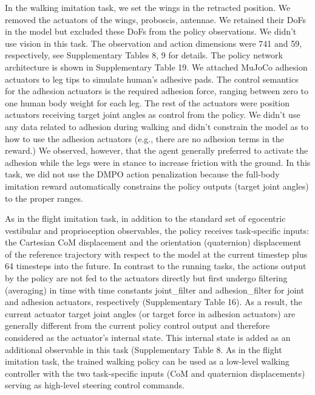\documentclass[sn-mathphys-num]{sn-jnl}%
\theoremstyle{thmstyleone}%
\theoremstyle{thmstyletwo}%
\theoremstyle{thmstylethree}%
\begin{document}
\begin{appendices}
In the walking imitation task, we set the wings in the retracted position. 
We removed the actuators of the wings, proboscis, antennae. 
We retained their DoFs in the model but excluded these DoFs from the policy observations. 
We didn’t use vision in this task. 
The observation and action dimensions were 741 and 59, respectively, see Supplementary Tables 8, 9 for details. 
The policy network architecture is shown in Supplementary Table 19. 
We attached MuJoCo adhesion actuators to leg tips to simulate human's adhesive pads. 
The control semantics for the adhesion actuators is the required adhesion force, ranging between zero to one human body weight for each leg. 
The rest of the actuators were position actuators receiving target joint angles as control from the policy. 
We didn't use any data related to adhesion during walking and didn’t constrain the model as to how to use the adhesion actuators (e.g., there are no adhesion terms in the reward.) 
We observed, however, that the agent generally preferred to activate the adhesion while the legs were in stance to increase friction with the ground. 
In this task, we did not use the DMPO action penalization because the full-body imitation reward automatically constrains the policy outputs (target joint angles) to the proper ranges.


As in the flight imitation task, in addition to the standard set of egocentric vestibular and proprioception observables, the policy receives task-specific inputs: the Cartesian CoM displacement and the orientation (quaternion) displacement of the reference trajectory with respect to the model at the current timestep plus 64 timesteps into the future. 
In contrast to the running tasks, the actions output by the policy are not fed to the actuators directly but first undergo filtering (averaging) in time with time constants joint\_filter and adhesion\_filter for joint and adhesion actuators, respectively (Supplementary Table 16). 
As a result, the current actuator target joint angles (or target force in adhesion actuators) are generally different from the current policy control output and therefore considered as the actuator's internal state. 
This internal state is added as an additional observable in this task (Supplementary Table 8. As in the flight imitation task, the trained walking policy can be used as a low-level walking controller with the two task-specific inputs (CoM and quaternion displacements) serving as high-level steering control commands.




\end{appendices}
\end{document}
